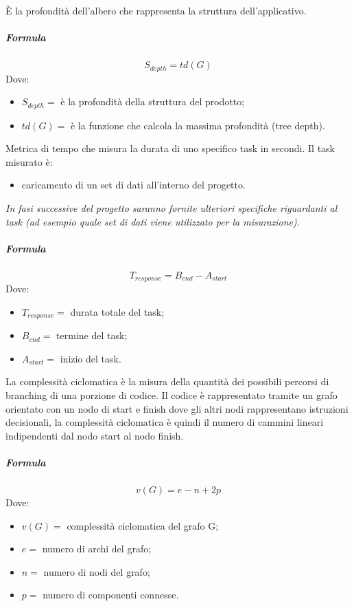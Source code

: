         È la profondità dell'albero che rappresenta la struttura dell'applicativo.
        \subparagraph{Formula}
        \begin{displaymath}
          S_{depth} = td(G)
        \end{displaymath}
        Dove:
        \begin{itemize}
          \item[] $S_{depth} =$ è la profondità della struttura del prodotto;
          \item[] $td(G) =$ è la funzione che calcola la massima profondità (tree 
        depth).
        \end{itemize}
        
        Metrica di tempo che misura la durata di uno specifico task in secondi. Il 
        task misurato è:
        \begin{itemize}
          \item caricamento di un set di dati all'interno del progetto.
        \end{itemize}
        \textit{In fasi successive del progetto saranno fornite ulteriori specifiche 
        riguardanti al task (ad esempio quale set di dati viene utilizzato per la 
        misurazione).}
        \subparagraph{Formula}
        \begin{displaymath}
          T_{response} = B_{end}-A_{start}
        \end{displaymath}
        Dove:
        \begin{itemize}
          \item[] $T_{response} =$ durata totale del task;
          \item[] $B_{end} =$ termine del task;
          \item[] $A_{start} =$ inizio del task.
        \end{itemize}
        
        La complessità ciclomatica è la misura della quantità dei possibili percorsi di 
        branching di una porzione di codice. Il codice è rappresentato tramite un 
        grafo orientato con un nodo di start e finish dove gli altri nodi rappresentano 
        istruzioni decisionali, la complessità ciclomatica è quindi il numero di 
        cammini lineari indipendenti dal nodo start al nodo finish.
        \subparagraph{Formula}
        \begin{displaymath}
          v(G) = e - n + 2p
        \end{displaymath}
        Dove:
        \begin{itemize}
          \item[] $v(G) =$ complessità ciclomatica del grafo G;
          \item[] $e =$ numero di archi del grafo;
          \item[] $n =$ numero di nodi del grafo;
          \item[] $p =$ numero di componenti connesse.
        \end{itemize}
        
